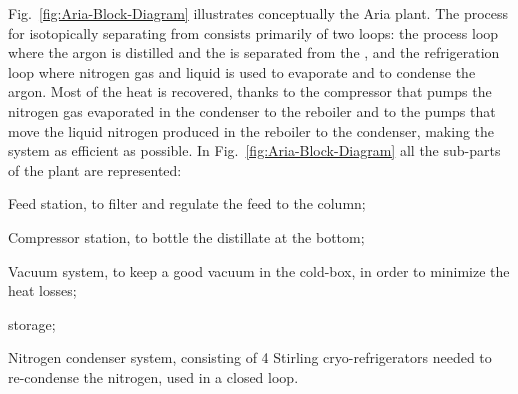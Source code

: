 Fig.~\ref{fig:Aria-Block-Diagram} illustrates conceptually the Aria plant. The process for isotopically separating  from  consists primarily of two loops: the process loop where the argon is distilled and the  is separated from the , and the refrigeration loop where nitrogen gas and liquid is used to evaporate and to condense the argon. Most of the heat is recovered, thanks to the compressor that pumps the nitrogen gas evaporated in the condenser to the reboiler and to the pumps that move the liquid nitrogen produced in the reboiler to the condenser, making the system as efficient as possible.  In Fig.~\ref{fig:Aria-Block-Diagram} all the sub-parts of the plant are represented:
\begin{compactitem}
\item Feed station, to filter and regulate the feed to the column;
\item Compressor station, to bottle the distillate at the bottom;
\item Vacuum system, to keep a good vacuum in the cold-box, in order to minimize the heat losses;
\item {} storage;
\item Nitrogen condenser system, consisting of 4 Stirling cryo-refrigerators needed to re-condense the nitrogen, used in a closed loop.
\end{compactitem}

